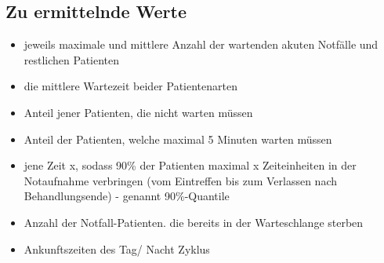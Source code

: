 \documentclass{article}
\begin{document}
\subsection{Zu ermittelnde Werte}
\begin{itemize}
    \item jeweils maximale und mittlere Anzahl der wartenden akuten Notfälle und restlichen Patienten
    \item die mittlere Wartezeit beider Patientenarten
    \item Anteil jener Patienten, die nicht warten müssen
    \item Anteil der Patienten, welche maximal 5 Minuten warten müssen
    \item jene Zeit x, sodass 90\% der Patienten maximal x Zeiteinheiten in der Notaufnahme verbringen (vom Eintreffen bis zum Verlassen nach Behandlungsende) - genannt 90\%-Quantile
    \item Anzahl der Notfall-Patienten. die bereits in der Warteschlange sterben
    \item Ankunftszeiten des Tag/ Nacht Zyklus
\end{itemize}
\end{document}
